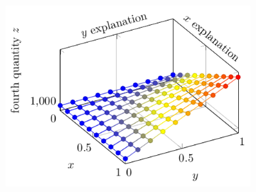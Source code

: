 \documentclass{scrbook}
\begin{document}
\begin{figure}
\begin{subfigure}{0.5\linewidth}
		\end{subfigure}
		\begin{subfigure}{0.5\linewidth}
			\includegraphics{3dplot_d.pdf}
		\end{subfigure}
	\end{figure}
\end{document}
